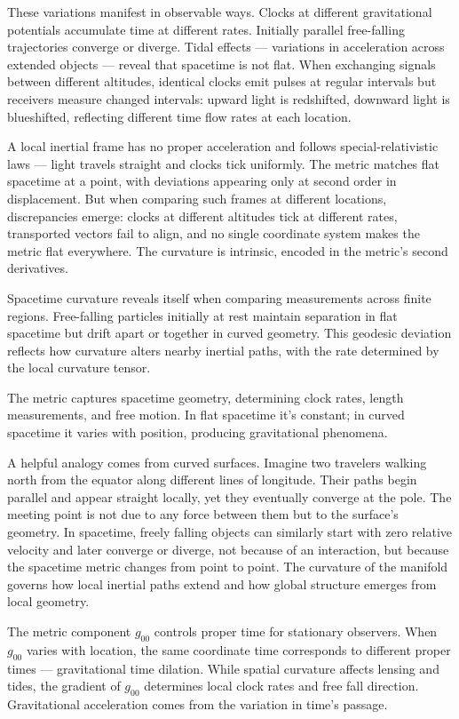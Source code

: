 These variations manifest in observable ways. Clocks at different gravitational potentials accumulate time at different rates. Initially parallel free-falling trajectories converge or diverge. Tidal effects — variations in acceleration across extended objects — reveal that spacetime is not flat. When exchanging signals between different altitudes, identical clocks emit pulses at regular intervals but receivers measure changed intervals: upward light is redshifted, downward light is blueshifted, reflecting different time flow rates at each location.

A local inertial frame has no proper acceleration and follows special-relativistic laws — light travels straight and clocks tick uniformly. The metric matches flat spacetime at a point, with deviations appearing only at second order in displacement. But when comparing such frames at different locations, discrepancies emerge: clocks at different altitudes tick at different rates, transported vectors fail to align, and no single coordinate system makes the metric flat everywhere. The curvature is intrinsic, encoded in the metric's second derivatives.

Spacetime curvature reveals itself when comparing measurements across finite regions. Free-falling particles initially at rest maintain separation in flat spacetime but drift apart or together in curved geometry. This geodesic deviation reflects how curvature alters nearby inertial paths, with the rate determined by the local curvature tensor.

The metric captures spacetime geometry, determining clock rates, length measurements, and free motion. In flat spacetime it's constant; in curved spacetime it varies with position, producing gravitational phenomena.

A helpful analogy comes from curved surfaces. Imagine two travelers walking north from the equator along different lines of longitude. Their paths begin parallel and appear straight locally, yet they eventually converge at the pole. The meeting point is not due to any force between them but to the surface’s geometry. In spacetime, freely falling objects can similarly start with zero relative velocity and later converge or diverge, not because of an interaction, but because the spacetime metric changes from point to point. The curvature of the manifold governs how local inertial paths extend and how global structure emerges from local geometry.

The metric component \( g_{00} \) controls proper time for stationary observers. When \( g_{00} \) varies with location, the same coordinate time corresponds to different proper times — gravitational time dilation. While spatial curvature affects lensing and tides, the gradient of \( g_{00} \) determines local clock rates and free fall direction. Gravitational acceleration comes from the variation in time's passage.

